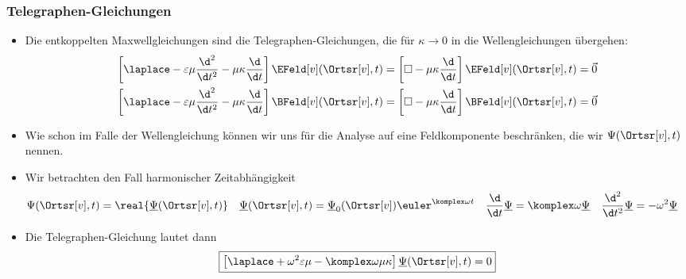 \begin{frame}
  \frametitle{Telegraphen-Gleichungen}
  \begin{itemize}[<+->]
  \item Die entkoppelten Maxwellgleichungen sind die \alert{Telegraphen-Gleichungen}, die für \(\kappa \to 0\) in die Wellengleichungen übergehen:
    \begin{align*}
      \left[\laplace - \varepsilon\mu \frac{\d^2}{\d t^2} -\mu\kappa \frac{\d}{\d t}\right]\EFeld[v](\Ortsr[v], t) = \left[\square -\mu\kappa \frac{\d}{\d t}\right]\EFeld[v](\Ortsr[v], t) &= \vec{0}\\
      \left[\laplace - \varepsilon\mu \frac{\d^2}{\d t^2} -\mu\kappa \frac{\d}{\d t}\right]\BFeld[v](\Ortsr[v], t) = \left[\square -\mu\kappa \frac{\d}{\d t}\right]\BFeld[v](\Ortsr[v], t)&= \vec{0}
    \end{align*}
  \item Wie schon im Falle der Wellengleichung können wir uns für die Analyse auf eine Feldkomponente beschränken, die wir \(\Psi(\Ortsr[v], t)\) nennen.
  \item Wir betrachten den Fall \alert{harmonischer Zeitabhängigkeit}
    \begin{align*}
      \Psi(\Ortsr[v], t) &= \real{\underline{\Psi}(\Ortsr[v], t)} & \underline{\Psi}(\Ortsr[v], t) &= \underline{\Psi}_0(\Ortsr[v]) \euler^{\komplex\omega t} & \frac{\d}{\d t} \underline{\Psi} &= \komplex\omega \underline{\Psi} & \frac{\d^2}{\d t^2} \underline{\Psi} &= -\omega^2 \underline{\Psi} 
    \end{align*}
  \item Die Telegraphen-Gleichung lautet dann
    \begin{equation*}
      \boxed{\left[ \laplace + \omega^2\varepsilon\mu - \komplex\omega\mu\kappa \right] \underline{\Psi}(\Ortsr[v], t) =0}
      \end{equation*}
    \end{itemize}
  \end{frame}
    

